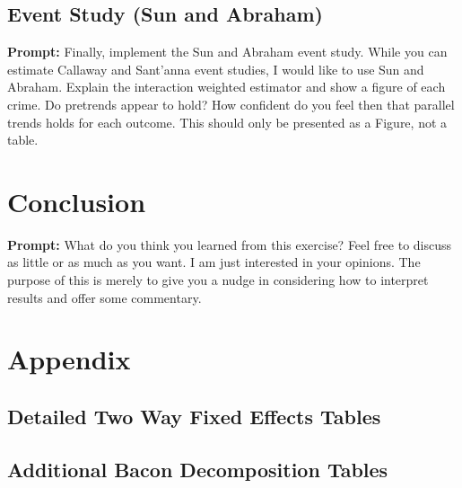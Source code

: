 \documentclass{article}
\begin{document}
\subsection{Event Study (Sun and Abraham)}

\textbf{Prompt: } Finally, implement the Sun and Abraham event study.  While you can estimate Callaway and Sant’anna event studies, I would like to use Sun and Abraham.  Explain the interaction weighted estimator and show a figure of each crime.  Do pretrends appear to hold?  How confident do you feel then that parallel trends holds for each outcome.  This should only be presented as a Figure, not a table.  

\section{Conclusion}

\textbf{Prompt: }What do you think you learned from this exercise?  Feel free to discuss as little or as much as you want.  I am just interested in your opinions.  The purpose of this is merely to give you a nudge in considering how to interpret results and offer some commentary. 

\newpage

\section{Appendix}

\subsection{Detailed Two Way Fixed Effects Tables}







\newpage

\subsection{Additional Bacon Decomposition Tables}














\end{document}
